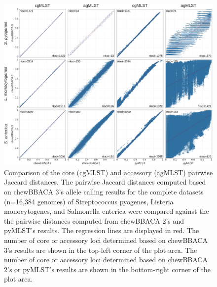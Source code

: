 \begin{figure}[h!]
    \centering
    \includegraphics[angle=0,width=\textwidth]{figures/chapter 2/Figure3.pdf}
    \caption{Comparison of the core (cgMLST) and accessory (agMLST) pairwise Jaccard distances. The pairwise Jaccard distances computed based on chewBBACA 3's allele calling results for the complete datasets (n=16,384 genomes) of Streptococcus pyogenes, Listeria monocytogenes, and Salmonella enterica were compared against the the pairwise distances computed from chewBBACA 2's and pyMLST's results. The regression lines are displayed in red. The number of core or accessory loci determined based on chewBBACA 3’s results are shown in the top-left corner of the plot area. The number of core or accessory loci determined based on chewBBACA 2’s or pyMLST’s results are shown in the bottom-right corner of the plot area.}
    \label{fig:chap2_figure3}
\end{figure}

